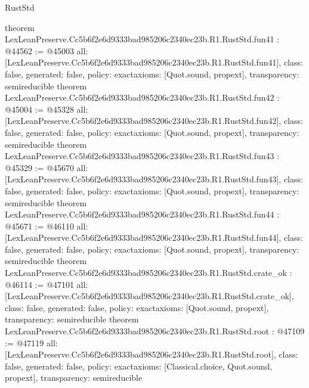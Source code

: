\begin{lexlean}{RustStd}
\begin{coremodule}
{}
theorem LexLeanPreserve.Cc5b6f2e6d9333bad985206c2340ec23b.R1.RustStd.fun41 : @44562 := @45003 {
  all: [LexLeanPreserve.Cc5b6f2e6d9333bad985206c2340ec23b.R1.RustStd.fun41],
  class: false,
  generated: false,
  policy: exact{axioms: [Quot.sound, propext]},
  transparency: semireducible
}
theorem LexLeanPreserve.Cc5b6f2e6d9333bad985206c2340ec23b.R1.RustStd.fun42 : @45004 := @45328 {
  all: [LexLeanPreserve.Cc5b6f2e6d9333bad985206c2340ec23b.R1.RustStd.fun42],
  class: false,
  generated: false,
  policy: exact{axioms: [Quot.sound, propext]},
  transparency: semireducible
}
theorem LexLeanPreserve.Cc5b6f2e6d9333bad985206c2340ec23b.R1.RustStd.fun43 : @45329 := @45670 {
  all: [LexLeanPreserve.Cc5b6f2e6d9333bad985206c2340ec23b.R1.RustStd.fun43],
  class: false,
  generated: false,
  policy: exact{axioms: [Quot.sound, propext]},
  transparency: semireducible
}
theorem LexLeanPreserve.Cc5b6f2e6d9333bad985206c2340ec23b.R1.RustStd.fun44 : @45671 := @46110 {
  all: [LexLeanPreserve.Cc5b6f2e6d9333bad985206c2340ec23b.R1.RustStd.fun44],
  class: false,
  generated: false,
  policy: exact{axioms: [Quot.sound, propext]},
  transparency: semireducible
}
theorem LexLeanPreserve.Cc5b6f2e6d9333bad985206c2340ec23b.R1.RustStd.crate_ok : @46114 := @47101 {
  all: [LexLeanPreserve.Cc5b6f2e6d9333bad985206c2340ec23b.R1.RustStd.crate_ok],
  class: false,
  generated: false,
  policy: exact{axioms: [Quot.sound, propext]},
  transparency: semireducible
}
theorem LexLeanPreserve.Cc5b6f2e6d9333bad985206c2340ec23b.R1.RustStd.root : @47109 := @47119 {
  all: [LexLeanPreserve.Cc5b6f2e6d9333bad985206c2340ec23b.R1.RustStd.root],
  class: false,
  generated: false,
  policy: exact{axioms: [Classical.choice, Quot.sound, propext]},
  transparency: semireducible
}


\end{coremodule}
\end{lexlean}
